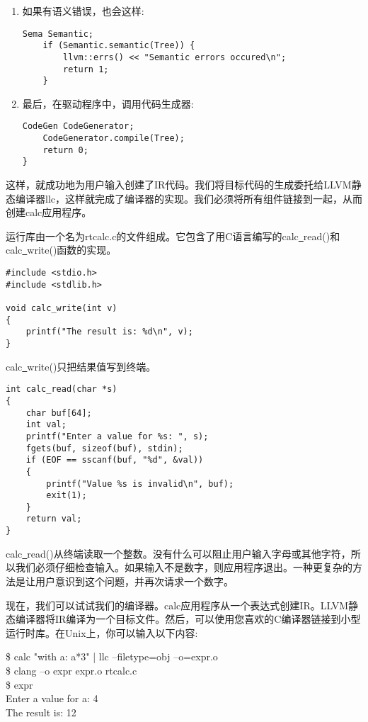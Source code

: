 \begin{enumerate}
\item 如果有语义错误，也会这样:
\begin{lstlisting}[caption={}]
	Sema Semantic;
	if (Semantic.semantic(Tree)) {
		llvm::errs() << "Semantic errors occured\n";
		return 1;
	}
\end{lstlisting}

\item 最后，在驱动程序中，调用代码生成器:
\begin{lstlisting}[caption={}]
	CodeGen CodeGenerator;
	CodeGenerator.compile(Tree);
	return 0;
}
\end{lstlisting}

\end{enumerate}

这样，就成功地为用户输入创建了IR代码。我们将目标代码的生成委托给LLVM静态编译器llc，这样就完成了编译器的实现。我们必须将所有组件链接到一起，从而创建calc应用程序。\par

运行库由一个名为rtcalc.c的文件组成。它包含了用C语言编写的calc\underline{~}read()和calc\underline{~}write()函数的实现。\par

\begin{lstlisting}[caption={}]
#include <stdio.h>
#include <stdlib.h>

void calc_write(int v)
{
	printf("The result is: %d\n", v);
}
\end{lstlisting}

calc\underline{~}write()只把结果值写到终端。

\begin{lstlisting}[caption={}]
int calc_read(char *s)
{
	char buf[64];
	int val;
	printf("Enter a value for %s: ", s);
	fgets(buf, sizeof(buf), stdin);
	if (EOF == sscanf(buf, "%d", &val))
	{
		printf("Value %s is invalid\n", buf);
		exit(1);
	}
	return val;
}
\end{lstlisting}

calc\underline{~}read()从终端读取一个整数。没有什么可以阻止用户输入字母或其他字符，所以我们必须仔细检查输入。如果输入不是数字，则应用程序退出。一种更复杂的方法是让用户意识到这个问题，并再次请求一个数字。\par

现在，我们可以试试我们的编译器。calc应用程序从一个表达式创建IR。LLVM静态编译器将IR编译为一个目标文件。然后，可以使用您喜欢的C编译器链接到小型运行时库。在Unix上，你可以输入以下内容:\par

\begin{tcolorbox}[colback=white,colframe=black]
\$ calc "with a: a*3" | llc –filetype=obj –o=expr.o \\
\$ clang –o expr expr.o rtcalc.c \\
\$ expr \\
\hspace*{0.5cm}Enter a value for a: 4 \\
\hspace*{0.5cm}The result is: 12
\end{tcolorbox}

